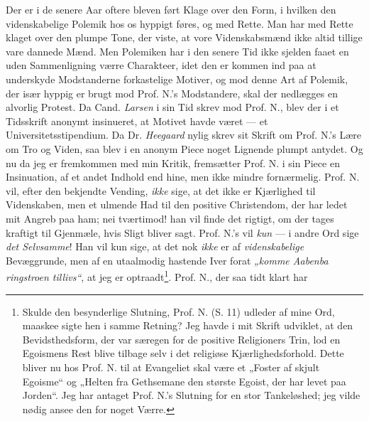 \documentclass[12pt,a4paper]{book}
\newcommand{\opage}[1]{\marginnote{\footnotesize\textit{[#1]}}}
\begin{document}
Der er i de senere Aar oftere bleven ført Klage over den Form, i hvilken den
videnskabelige Polemik hos os hyppigt føres, og med Rette. Man har med Rette
klaget over den plumpe Tone, der viste, at vore Videnskabsmænd ikke altid tillige
vare dannede Mænd. Men Polemiken har i den senere Tid ikke sjelden faaet en uden
Sammenligning værre Charakteer, idet den er kommen ind paa at underskyde
Modstanderne forkastelige Motiver, og mod denne Art af Polemik, der især hyppig
er brugt mod Prof. N.'s Modstandere, skal der nedlægges en alvorlig Protest. Da
Cand. \emph{Larsen} i sin Tid skrev mod Prof. N., blev der i et Tidsskrift
anonymt insinueret, at Motivet havde været --- et Universitetsstipendium. Da
Dr. \emph{Heegaard} nylig skrev sit Skrift om Prof. N.'s Lære om Tro og Viden,
saa blev i en anonym Piece noget Lignende plumpt antydet. Og nu da jeg er
fremkommen med min Kritik, fremsætter Prof. N. i sin Piece en Insinuation, af et
andet Indhold end hine, men ikke mindre fornærmelig. Prof. N. vil, efter den
bekjendte Vending, \emph{ikke} sige, at det ikke er Kjærlighed til Videnskaben,
men et ulmende Had til den positive Christendom, der har ledet mit Angreb paa
ham; nei tværtimod! han vil finde det rigtigt, om der tages kraftigt til
Gjenmæle, hvis Sligt bliver sagt. Prof. N.'s vil \emph{kun} --- i andre Ord sige
\emph{det Selvsamme}! Han vil kun sige, at det nok \emph{ikke} er af
\emph{videnskabelige} Bevæggrunde, men af en utaalmodig hastende Iver forat
\emph{„komme Aabenba\-%
\opage{28}%
\setcounter{footnote}{0}%
ringstroen tillivs“}, at jeg er optraadt\footnote{%
  Skulde den besynderlige Slutning, Prof. N. (S. 11) udleder af mine Ord,
  maaskee sigte hen i samme Retning? Jeg havde i mit Skrift udviklet, at den
  Bevidsthedsform, der var særegen for de positive Religioners Trin, lod en
  Egoismens Rest blive tilbage selv i det religiøse Kjærlighedsforhold. Dette
  bliver nu hos Prof. N. til at Evangeliet skal være et „Foster af skjult
  Egoisme“ og „Helten fra Gethsemane den største Egoist, der har levet paa
  Jorden“. Jeg har antaget Prof. N.'s Slutning for en stor Tankeløshed; jeg
  vilde nødig ansee den for noget Værre.}. Prof. N., der saa tidt klart har
\end{document}
